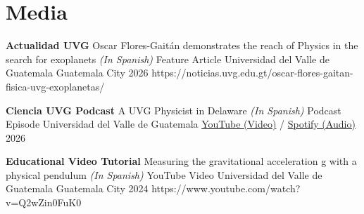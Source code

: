 \section{Media}

\begin{onecolentry}
\begin{etaremune}
    \resumeTalkEntry
        {\textbf{Actualidad UVG}}
        {Oscar Flores-Gaitán demonstrates the reach of Physics in the search for exoplanets \textnormal{\textit{(In Spanish)}}}
        {Feature Article}
        {Universidad del Valle de Guatemala}
        {Guatemala City}
        {2026}
        {https://noticias.uvg.edu.gt/oscar-flores-gaitan-fisica-uvg-exoplanetas/}

    \resumeTalkEntry
        {\textbf{Ciencia UVG Podcast}}
        {A UVG Physicist in Delaware \textnormal{\textit{(In Spanish)}}}
        {Podcast Episode}
        {Universidad del Valle de Guatemala}
        {\href{https://youtu.be/eA0EQ50V8YA?si=vW6mQ4eySpwrw55R}{YouTube (Video)} / \href{https://open.spotify.com/episode/3ZpnRPsEQ6Lzc4CZHmhH9e}{Spotify (Audio)}}
        {2026}
        {}

    \resumeTalkEntry
        {\textbf{Educational Video Tutorial}}
        {Measuring the gravitational acceleration g with a physical pendulum \textnormal{\textit{(In Spanish)}}}
        {YouTube Video}
        {Universidad del Valle de Guatemala}
        {Guatemala City}
        {2024}
        {https://www.youtube.com/watch?v=Q2wZin0FuK0}
\end{etaremune}
\end{onecolentry}
